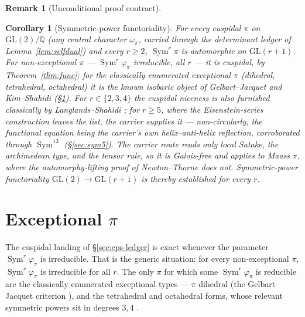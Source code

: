 \documentclass[11pt]{article}
\newtheorem{corollary}[theorem]{Corollary}
\theoremstyle{definition}
\newtheorem{remark}[theorem]{Remark}
\newcommand{\Sym}{\operatorname{Sym}}
\begin{document}
\begin{remark}[Unconditional proof contract]
\begin{enumerate}
\begin{corollary}[Symmetric-power functoriality]\label{cor:func234}
For every cuspidal $\pi$ on $\mathrm{GL}(2)/\mathbb Q$ (any central character $\omega_\pi$, carried through the
determinant ledger of Lemma~\ref{lem:selfdual}) and every $r\ge2$, $\Sym^r\pi$ is automorphic on
$\mathrm{GL}(r+1)$. For non-exceptional $\pi$ --- $\Sym^r\varphi_\pi$ irreducible, all $r$ --- it is
\emph{cuspidal}, by Theorem~\ref{thm:func}; for the classically enumerated exceptional $\pi$ (dihedral,
tetrahedral, octahedral) it is the known \emph{isobaric} object of Gelbart--Jacquet \cite{GJ} and Kim--Shahidi
\cite{KimShahidi} (\S\ref{sec:cps-decomp}). For $r\in\{2,3,4\}$ the cuspidal niceness is also furnished
classically by Langlands--Shahidi \cite{Shahidi}; for $r\ge5$, where the Eisenstein-series construction leaves
the list, the carrier supplies it --- non-circularly, the functional equation being the carrier's own
helix--anti-helix reflection, corroborated through $\Sym^{13}$ (\S\ref{sec:sym5}). The carrier route reads only
local Satake, the archimedean type, and the tensor rule, so it is Galois-free and applies to Maass $\pi$, where
the automorphy-lifting proof of Newton--Thorne \cite{NT} does not. Symmetric-power functoriality
$\mathrm{GL}(2)\to\mathrm{GL}(r+1)$ is thereby established for every $r$.
\end{corollary}

\section{Exceptional $\pi$}\label{sec:cps-decomp}
The cuspidal landing of \S\ref{sec:cps-ledger} is exact whenever the parameter $\Sym^r\varphi_\pi$ is
irreducible. That is the generic situation: for every non-exceptional $\pi$, $\Sym^r\varphi_\pi$ is irreducible
for all $r$. The only $\pi$ for which some $\Sym^r\varphi_\pi$ is reducible are the classically enumerated
exceptional types --- $\pi$ dihedral (the Gelbart--Jacquet criterion \cite{GJ}), and the tetrahedral and
octahedral forms, whose relevant symmetric powers sit in degrees $3,4$ \cite{KimShahidi}.


\end{enumerate}
\end{remark}
\end{document}
